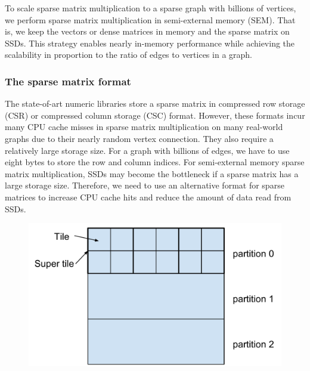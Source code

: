 To scale sparse matrix multiplication to a sparse graph with billions of vertices,
we perform sparse matrix multiplication in semi-external memory (SEM). That is,
we keep the vectors or dense matrices in memory and the sparse
matrix on SSDs. This strategy enables nearly in-memory performance while achieving
the scalability in proportion to the ratio of edges to vertices in a graph.

\subsubsection{The sparse matrix format}
The state-of-art numeric libraries store a sparse matrix in compressed row storage
(CSR) or compressed column storage (CSC) format. However, these formats incur
many CPU cache misses in sparse matrix multiplication on many real-world graphs
due to their nearly random vertex connection. They also require a relatively
large storage size. For a graph with billions of edges, we have to use eight
bytes to store the row and column indices. For semi-external memory sparse
matrix multiplication, SSDs may become the bottleneck if a sparse matrix has
a large storage size.
Therefore, we need to use an alternative format for sparse matrices to increase
CPU cache hits and reduce the amount of data read from SSDs.

\begin{figure}
\centering
\includegraphics[scale=0.3]{./sparse_mat.pdf}
\vspace{-5pt}
\caption{}
\vspace{-5pt}
\label{sparse_mat}
\end{figure}

